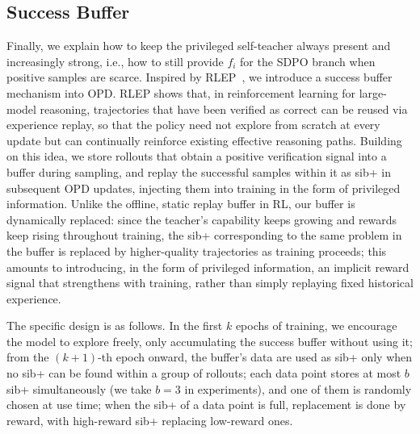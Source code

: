 \documentclass{article}
\begin{document}
\subsection{Success Buffer}
\label{sec:buffer}

Finally, we explain how to keep the privileged self-teacher always present and increasingly strong, i.e., how to still provide $f_i$ for the SDPO branch when positive samples are scarce. Inspired by RLEP~\citep{zhang2025rlep}, we introduce a success buffer mechanism into OPD. RLEP shows that, in reinforcement learning for large-model reasoning, trajectories that have been verified as correct can be reused via experience replay, so that the policy need not explore from scratch at every update but can continually reinforce existing effective reasoning paths. Building on this idea, we store rollouts that obtain a positive verification signal into a buffer during sampling, and replay the successful samples within it as sib+ in subsequent OPD updates, injecting them into training in the form of privileged information. Unlike the offline, static replay buffer in RL, our buffer is dynamically replaced: since the teacher's capability keeps growing and rewards keep rising throughout training, the sib+ corresponding to the same problem in the buffer is replaced by higher-quality trajectories as training proceeds; this amounts to introducing, in the form of privileged information, an implicit reward signal that strengthens with training, rather than simply replaying fixed historical experience.

The specific design is as follows. In the first $k$ epochs of training, we encourage the model to explore freely, only accumulating the success buffer without using it; from the $(k{+}1)$-th epoch onward, the buffer's data are used as sib+ only when no sib+ can be found within a group of rollouts; each data point stores at most $b$ sib+ simultaneously (we take $b=3$ in experiments), and one of them is randomly chosen at use time; when the sib+ of a data point is full, replacement is done by reward, with high-reward sib+ replacing low-reward ones.
\end{document}
